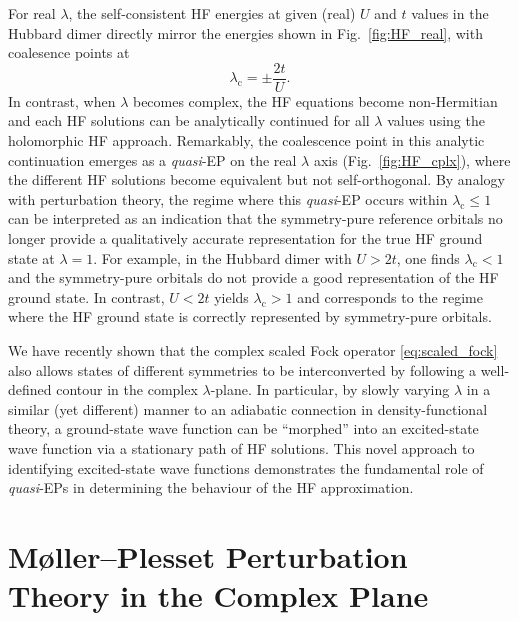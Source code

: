 \documentclass[aps,prb,reprint,noshowkeys,superscriptaddress]{revtex4-1}
\begin{document}
For real $\lambda$, the self-consistent HF energies at given (real) $U$ and $t$ values
in the Hubbard dimer directly mirror the energies shown in Fig.~\ref{fig:HF_real}, 
with coalesence points at 
\begin{equation}
    \lambda_{\text{c}} = \pm \frac{2t}{U}.
    \label{eq:scaled_fock}
\end{equation}
In contrast, when $\lambda$ becomes complex, the HF equations become non-Hermitian and 
each HF solutions can be analytically continued for all $\lambda$ values using
the holomorphic HF approach.\cite{Hiscock_2014,Burton_2016,Burton_2018}
Remarkably, the coalescence point in this analytic continuation emerges as a 
\textit{quasi}-EP on the real $\lambda$ axis (Fig.~\ref{fig:HF_cplx}), where
the different HF solutions become equivalent but not self-orthogonal.\cite{Burton_2019}
By analogy with perturbation theory, the regime where this \textit{quasi}-EP occurs 
within $\lambda_{\text{c}} \le 1$ can be interpreted as an indication that 
the symmetry-pure reference orbitals no longer provide a qualitatively 
accurate representation for the true HF ground state at $\lambda = 1$.
For example, in the Hubbard dimer with $U > 2t$, one finds $\lambda_{\text{c}} < 1$ and the symmetry-pure orbitals
do not provide a good representation of the HF ground state.
In contrast, $U < 2t$ yields $\lambda_{\text{c}} > 1$ and corresponds to
the regime where the HF ground state is correctly represented by symmetry-pure orbitals.

We have recently shown that the complex scaled Fock operator \eqref{eq:scaled_fock}
also allows states of different symmetries to be interconverted by following a well-defined
contour in the complex $\lambda$-plane.\cite{Burton_2019}
In particular, by slowly varying $\lambda$ in a similar (yet different) manner
to an adiabatic connection in density-functional theory,\cite{Langreth_1975,Gunnarsson_1976,Zhang_2004} 
a ground-state wave function can be ``morphed'' into an excited-state wave function 
via a stationary path of HF solutions.
This novel approach to identifying excited-state wave functions demonstrates the fundamental 
role of \textit{quasi}-EPs in determining the behaviour of the HF approximation.

\section{M{\o}ller--Plesset Perturbation Theory in the Complex Plane}
\label{sec:MP}
\end{document}
